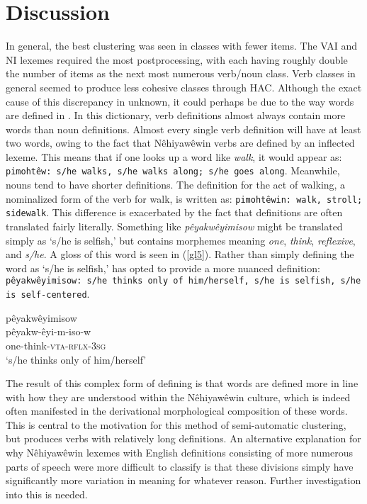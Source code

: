 \section{Discussion}
In general, the best clustering was seen in classes with fewer items. The VAI and NI lexemes required the most postprocessing, with each having roughly double the number of items as the next most numerous verb/noun class. Verb classes in general seemed to produce less cohesive classes through HAC. Although the exact cause of this discrepancy in unknown, it could perhaps be due to the way words are defined in \citet{Wolvengrey2001}. In this dictionary, verb definitions almost always contain more words than noun definitions. Almost every single verb definition will have at least two words, owing to the fact that Nêhiyawêwin verbs are defined by an inflected lexeme. This means that if one looks up a word like \textit{walk}, it would appear as: \texttt{pimohtêw: s/he walks, s/he walks along; s/he goes along}. Meanwhile, nouns tend to have shorter definitions. The definition for the act of walking, a nominalized form of the verb for walk, is written as: \texttt{pimohtêwin: walk, stroll; sidewalk}. This difference is exacerbated by the fact that definitions are often translated fairly literally. Something like \textit{pêyakwêyimisow} might be translated simply as `s/he is selfish,' but contains morphemes meaning \textit{one}, \textit{think}, \textit{reflexive}, and \textit{s/he}. A gloss of this word is seen in (\ref{gl5}). Rather than simply defining the word as `s/he is selfish,' \cite{Wolvengrey2001} has opted to provide a more nuanced definition: \texttt{pêyakwêyimisow: s/he thinks only of him/herself, s/he is selfish, s/he is self-centered}.

\begin{exe}
\ex
\glll pêyakwêyimisow \\
pêyakw-êyi-m-iso-w\\
one-think-\textsc{vta}-\textsc{rflx}-\textsc{3sg}\\
\trans `s/he thinks only of him/herself'
\label{gl5}
\end{exe}


The result of this complex form of defining is that words are defined more in line with how they are understood within the Nêhiyawêwin culture, which is indeed often manifested in the derivational morphological composition of these words. This is central to the motivation for this method of semi-automatic clustering, but produces verbs with relatively long definitions. 
An alternative explanation for why Nêhiyawêwin lexemes with English definitions consisting of more numerous parts of speech were more difficult to classify is that these divisions simply have significantly more variation in meaning for whatever reason. Further investigation into this is needed. 

